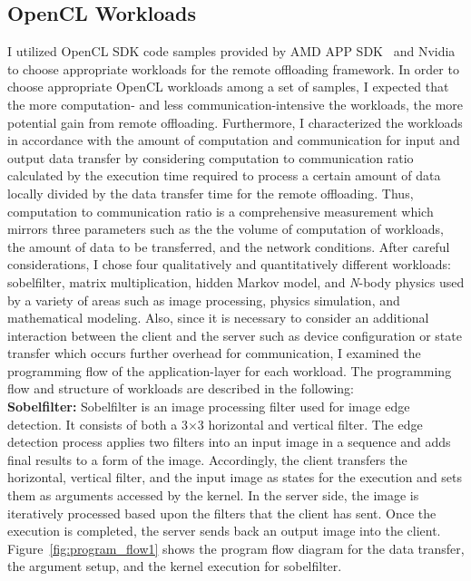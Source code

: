 \subsection{OpenCL Workloads}
\label{character:workloads}
%
I utilized OpenCL SDK code samples provided by AMD APP
SDK~\cite{amd} and Nvidia~\cite{nvidia} to choose appropriate workloads for
the remote offloading framework.
%
In order to choose appropriate OpenCL workloads among a set of samples,
I expected that the more computation- and less communication-intensive
the workloads, the more potential gain from remote offloading.
%
Furthermore, I characterized the workloads in accordance with the
amount of computation and communication for input and output data
transfer by considering computation to communication ratio
calculated by the execution time required to process a certain amount of
data locally divided by the data transfer time for the remote offloading.
%
Thus, computation to communication ratio is a
comprehensive measurement which mirrors three parameters such as the
the volume of computation of workloads, the amount of data to be transferred, and the
network conditions.
%
After careful considerations, I chose four qualitatively and
quantitatively different workloads: sobelfilter, matrix multiplication,
hidden Markov model, and {\it N}-body physics used by a variety of areas such as
image processing, physics simulation, and mathematical modeling.
%
Also, since it is necessary to consider an additional interaction 
between the client and the server such as device configuration 
or state transfer which occurs further overhead for communication, 
I examined the programming flow of the application-layer for each workload.
%
The programming flow and structure of workloads are described in the following:\\
%
{\bf Sobelfilter:} Sobelfilter is an image processing filter used for
image edge detection.
%
It consists of both a 3$\times$3 horizontal and vertical filter.
%
The edge detection process applies two filters into an input image in a
sequence and adds final results to a form of the image.
%
Accordingly, the client transfers the horizontal, vertical filter, and
the input image as states for the execution and sets them as arguments
accessed by the kernel.
%
In the server side, the image is iteratively processed based upon the
filters that the client has sent.
%
Once the execution is completed, the server sends back an output image
into the client.
%
Figure~\ref{fig:program_flow1} shows the program flow diagram for the data transfer, the argument
setup, and the kernel execution for sobelfilter.\\
